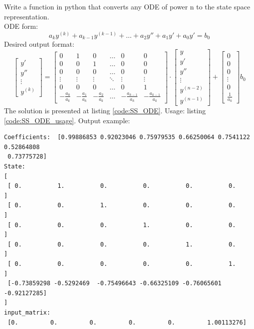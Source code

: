 \documentclass[12pt,letterpaper]{article}
\begin{document}
\begin{enumerate}[leftmargin=!,labelindent=5pt]
    Write a function in python that converts any ODE of power n to the state space representation. \\
    
    ODE form:
    \begin{equation*}
        a_{k}y^{(k)} + a_{k-1}y^{(k-1)} + \dots + a_2 y'' + a_1 y' + a_0 y' = b_0
    \end{equation*}
    Desired output format: 
    \begin{equation*}
        \left[\begin{matrix}y'\\y''\\\vdots\\y^{(k)}\end{matrix}\right] = 
        \left[\begin{matrix}0&1&0&\dots&0&0\\0&0&1&\dots&0&0\\0&0&0&\dots&0&0\\\vdots&\vdots&\vdots&\ddots&\vdots&\vdots\\0&0&0&\dots&0&1\\-\frac{a_0}{a_k}&-\frac{a_1}{a_k}&-\frac{a_2}{a_k}&\dots&-\frac{a_{k-1}}{a_k}&-\frac{a_{k-1}}{a_k}\end{matrix}\right] \cdot
        \left[\begin{matrix}y\\y'\\y''\\\vdots\\y^{(n-2)}\\y^{(n-1)}\end{matrix}\right] + 
        \left[\begin{matrix}0\\0\\0\\\vdots\\0\\\frac{1}{a_k}\end{matrix}\right] b_0
    \end{equation*}
    The solution is presented at listing \ref{code:SS_ODE}. Usage: listing \ref{code:SS_ODE_usage}. Output example:
    \begin{verbatim}
Coefficients:  [0.99886853 0.92023046 0.75979535 0.66250064 0.7541122  0.52864808 
 0.73775728]
State:
[
 [ 0.          1.          0.          0.          0.          0.        ]
 [ 0.          0.          1.          0.          0.          0.        ]
 [ 0.          0.          0.          1.          0.          0.        ]
 [ 0.          0.          0.          0.          1.          0.        ]
 [ 0.          0.          0.          0.          0.          1.        ]
 [-0.73859298 -0.5292469  -0.75496643 -0.66325109 -0.76065601 -0.92127285]
] 
input_matrix:
 [0.         0.         0.         0.         0.         1.00113276]
    \end{verbatim}
    
    

\end{enumerate}
\end{document}
